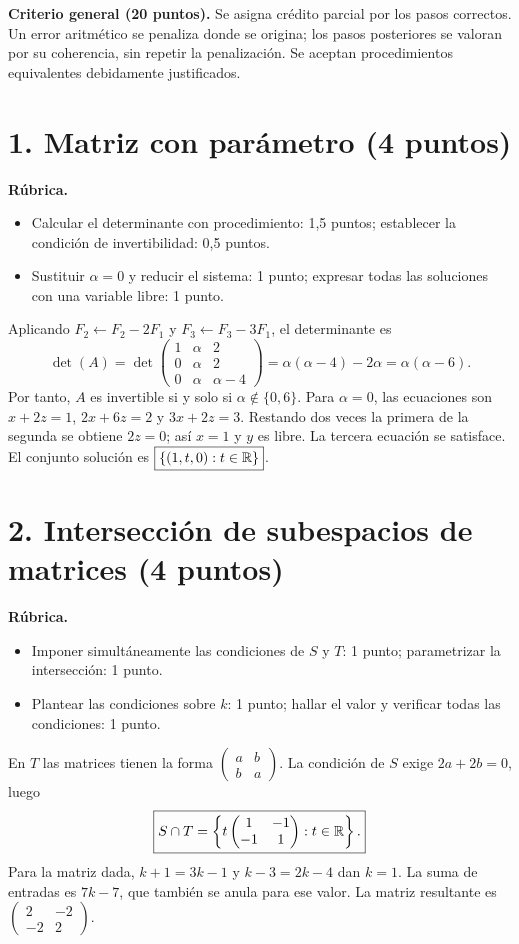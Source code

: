\documentclass[10pt,a4]{examenEPN0}
\begin{document}
\encabezado
\noindent\textbf{Criterio general (20 puntos).} Se asigna crédito parcial por
los pasos correctos. Un error aritmético se penaliza donde se origina;
los pasos posteriores se valoran por su coherencia, sin repetir la penalización.
Se aceptan procedimientos equivalentes debidamente justificados.

\section*{1. Matriz con parámetro (4 puntos)}
\noindent\textbf{Rúbrica.}
\begin{itemize}[itemsep=2pt]
    \item Calcular el determinante con procedimiento: 1,5 puntos; establecer la condición de invertibilidad: 0,5 puntos.
    \item Sustituir $\alpha=0$ y reducir el sistema: 1 punto; expresar todas las soluciones con una variable libre: 1 punto.
\end{itemize}
Aplicando $F_2\leftarrow F_2-2F_1$ y
$F_3\leftarrow F_3-3F_1$, el determinante es
\[
    \det(A)=\det\begin{pmatrix}1&\alpha&2\\0&\alpha&2\\0&\alpha&\alpha-4\end{pmatrix}
    =\alpha(\alpha-4)-2\alpha=\alpha(\alpha-6).
\]
Por tanto, $A$ es invertible si y solo si $\alpha\notin\{0,6\}$.
Para $\alpha=0$, las ecuaciones son $x+2z=1$, $2x+6z=2$ y
$3x+2z=3$. Restando dos veces la primera de la segunda se obtiene
$2z=0$; así $x=1$ y $y$ es libre. La tercera ecuación se satisface.
El conjunto solución es $\boxed{\{(1,t,0):t\in\mathbb{R}\}}$.

\section*{2. Intersección de subespacios de matrices (4 puntos)}
\noindent\textbf{Rúbrica.}
\begin{itemize}[itemsep=2pt]
    \item Imponer simultáneamente las condiciones de $S$ y $T$: 1 punto; parametrizar la intersección: 1 punto.
    \item Plantear las condiciones sobre $k$: 1 punto; hallar el valor y verificar todas las condiciones: 1 punto.
\end{itemize}
En $T$ las matrices tienen la forma $\begin{pmatrix}a&b\\b&a\end{pmatrix}$.
La condición de $S$ exige $2a+2b=0$, luego
\[
    \boxed{S\cap T=\left\{t\begin{pmatrix}1&-1\\-1&1\end{pmatrix}:t\in\mathbb{R}\right\}.}
\]
Para la matriz dada, $k+1=3k-1$ y $k-3=2k-4$ dan $k=1$.
La suma de entradas es $7k-7$, que también se anula para ese valor.
La matriz resultante es $\begin{pmatrix}2&-2\\-2&2\end{pmatrix}$.
\end{document}
